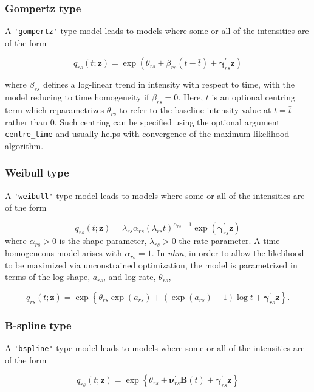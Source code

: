 \documentclass{article}
\numberwithin{equation}{section}
\begin{document}
\subsubsection*{Gompertz type}

A \verb!'gompertz'! type model leads to models where some or all of the intensities are of the form

$$q_{rs}(t ; \mathbf{z}) = \exp( \theta_{rs} + \beta_{rs}(t - \bar{t}) + \bm\gamma_{rs}^{'}\mathbf{z})$$

where $\beta_{rs}$ defines a log-linear trend in intensity with respect to time, with the model reducing to time homogeneity if $\beta_{rs}=0$. Here, $\bar{t}$ is an optional centring term which reparametrizes $\theta_{rs}$ to refer to the baseline intensity value at $t = \bar{t}$ rather than 0. Such centring can be specified using the optional argument \verb!centre_time! and usually helps with convergence of the maximum likelihood algorithm.

\subsubsection*{Weibull type}

A \verb!'weibull'! type model leads to models where some or all of the intensities are of the form

$$q_{rs}(t ; \mathbf{z}) = \lambda_{rs} \alpha_{rs} (\lambda_{rs} t)^{\alpha_{rs} - 1} \exp(\bm\gamma_{rs}^{'}\mathbf{z})$$
where $\alpha_{rs} >0$ is the shape parameter, $\lambda_{rs} > 0$ the rate parameter. A time homogeneous model arises with $\alpha_{rs} = 1$.
In {\it nhm}, in order to allow the likelihood to be maximized via unconstrained optimization, the model is parametrized in terms of the log-shape, $a_{rs}$, and log-rate, $\theta_{rs}$,

$$q_{rs}(t ; \mathbf{z}) = \exp\left\{ \theta_{rs} \exp(a_{rs}) + (\exp(a_{rs}) - 1)\log t  +\bm\gamma_{rs}^{'}\mathbf{z}\right\}.$$

\subsubsection*{B-spline type}

A \verb!'bspline'! type model leads to models where some or all of the intensities are of the form

\begin{equation}q_{rs}(t ; \mathbf{z}) = \exp\left\{ \theta_{rs} + \bm\nu_{rs}^{'}\mathbf{B}(t) +\bm\gamma_{rs}^{'}\mathbf{z}\right\}\label{splinemodel}\end{equation}
\end{document}
